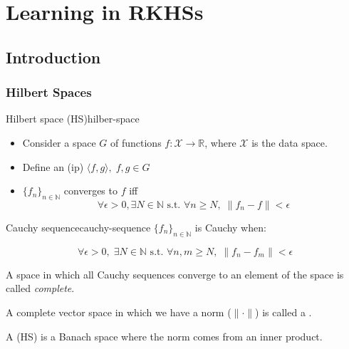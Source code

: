 \chapter[RKHSs]{Learning in RKHSs}

\section{Introduction}

\subsection{Hilbert Spaces}

\begin{definition}[parbox=false]{Hilbert space (HS)}{hilber-space}
	\begin{itemize}
		\item Consider a space $G$ of functions $f: \mathcal{X} \to \mathbb{R}$,
		      where $\mathcal{X}$ is the data space.

		\item Define an  (ip) $\langle f, g \rangle, \; f, g \in G$ %
		\item $\{f_n\}_{n \in \mathds{N}}$ converges to $f$ iff
		      $$\forall \epsilon > 0, \exists N \in \mathds{N} \text{ s.t. } \forall n \geq N, \; \lVert f_n - f \rVert < \epsilon$$
	\end{itemize}
  \begin{definition}{Cauchy sequence}{cauchy-sequence}
		      $\{f_n\}_{n \in \mathds{N}}$ is Cauchy when:

		      $$\forall \epsilon > 0, \; \exists N \in \mathds{N} \text{ s.t. } \forall n, m \geq N, \; \lVert f_n - f_m \rVert < \epsilon$$
  \end{definition}

	A space in which all Cauchy sequences converge to an element of the space is
  called \emph{complete}.

	A complete vector space in which we have
	a norm ($\lVert \cdot \rVert$) is called a .

	\begin{marker}
		A  (HS) is a Banach space where the norm
		comes from an inner product.
	\end{marker}

\end{definition}

